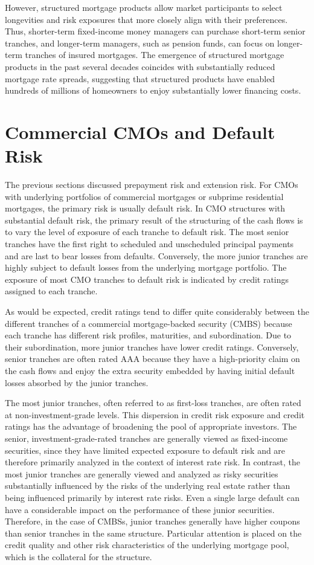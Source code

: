 \documentclass[11pt]{article}
\begin{document}
However, structured mortgage products allow market participants to select longevities and risk exposures that more closely align with their preferences. Thus, shorter-term fixed-income money managers can purchase short-term senior tranches, and longer-term managers, such as pension funds, can focus on longer-term tranches of insured mortgages. The emergence of structured mortgage products in the past several decades coincides with substantially reduced mortgage rate spreads, suggesting that structured products have enabled hundreds of millions of homeowners to enjoy substantially lower financing costs.

\section*{Commercial CMOs and Default Risk}
The previous sections discussed prepayment risk and extension risk. For CMOs with underlying portfolios of commercial mortgages or subprime residential mortgages, the primary risk is usually default risk. In CMO structures with substantial default risk, the primary result of the structuring of the cash flows is to vary the level of exposure of each tranche to default risk. The most senior tranches have the first right to scheduled and unscheduled principal payments and are last to bear losses from defaults. Conversely, the more junior tranches are highly subject to default losses from the underlying mortgage portfolio. The exposure of most CMO tranches to default risk is indicated by credit ratings assigned to each tranche.

As would be expected, credit ratings tend to differ quite considerably between the different tranches of a commercial mortgage-backed security (CMBS) because each tranche has different risk profiles, maturities, and subordination. Due to their subordination, more junior tranches have lower credit ratings. Conversely, senior tranches are often rated AAA because they have a high-priority claim on the cash flows and enjoy the extra security embedded by having initial default losses absorbed by the junior tranches.

The most junior tranches, often referred to as first-loss tranches, are often rated at non-investment-grade levels. This dispersion in credit risk exposure and credit ratings has the advantage of broadening the pool of appropriate investors. The senior, investment-grade-rated tranches are generally viewed as fixed-income securities, since they have limited expected exposure to default risk and are therefore primarily analyzed in the context of interest rate risk. In contrast, the most junior tranches are generally viewed and analyzed as risky securities substantially influenced by the risks of the underlying real estate rather than being influenced primarily by interest rate risks. Even a single large default can have a considerable impact on the performance of these junior securities. Therefore, in the case of CMBSs, junior tranches generally have higher coupons than senior tranches in the same structure. Particular attention is placed on the credit quality and other risk characteristics of the underlying mortgage pool, which is the collateral for the structure.
\end{document}

